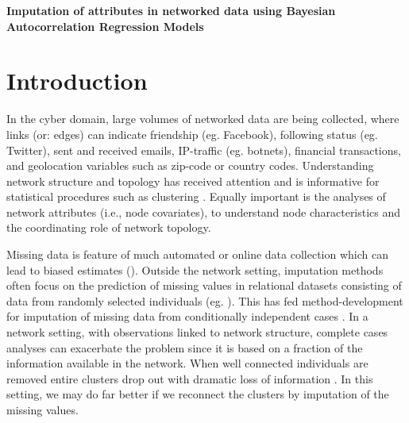 \documentclass{article}
\begin{document}
{\Large \textbf{Imputation of attributes in networked data using Bayesian Autocorrelation Regression Models}\par}

\section{Introduction}

In the cyber domain, large volumes of networked data are being collected, where links (or: edges) can indicate friendship (eg. Facebook), following status (eg. Twitter), sent and received emails, IP-traffic (eg. botnets), financial transactions, and geolocation variables such as zip-code or country codes. Understanding network structure and topology has received attention and is informative for  statistical procedures such as clustering \cites{blondel2008fast, holland1983stochastic}. Equally important is the analyses of network attributes (i.e., node covariates), to understand node characteristics and the coordinating role of network topology.

Missing data is feature of much automated or online data collection which can lead to biased estimates (\cites{little2019statistical, schafer2002missing}). Outside the network setting, imputation methods often focus on the prediction of missing values in relational datasets consisting of data from randomly selected individuals (eg. \cites{harel2007multiple, rezvan2015rise}). This has fed method-development for imputation of missing data from conditionally independent cases \cite{van2012flexible}. In a network setting, with observations linked to network structure, complete cases analyses can exacerbate the problem since it is based on a fraction of the information available in the network. When well connected individuals are removed entire clusters drop out with dramatic loss of information \cites{huisman2008treatment, hancock2007modeling}. In this setting, we may do far better if we reconnect the clusters by imputation of the missing values.
\end{document}
